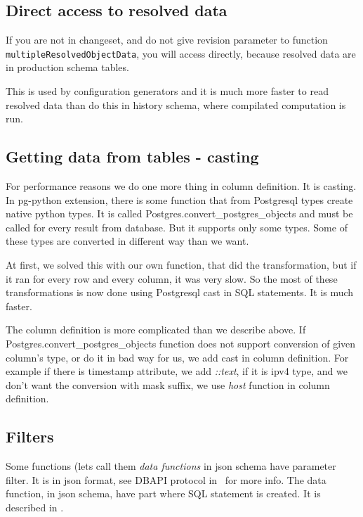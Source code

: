 \documentclass[deska]{subfiles}
\begin{document}
\subsection{Direct access to resolved data}
\label{sec:direct-access}
If you are not in changeset, and do not give revision parameter to function {\tt multipleResolvedObjectData},
you will access directly, because resolved data are in production schema tables.

This is used by configuration generators and it is much more faster to read
resolved data than do this in history schema, where compilated computation is run.

\subsection{Getting data from tables - casting}
\label{sec:cast}
For performance reasons we do one more thing in column definition. It is casting.
In pg-python extension, there is some function that from Postgresql types create native python types.
It is called Postgres.convert\_postgres\_objects
and must be called for every result from database. But it supports only some types.
Some of these types are converted in different way than we want.

At first, we solved this with our own function, that did the transformation, but if it ran for every
row and every column, it was very slow. So the most of these transformations is now done using Postgresql cast
in SQL statements. It is much faster.

The column definition is more complicated than we describe above. If
Postgres.convert\_postgres\_objects function 
does not support conversion of given column's type, or do it in bad way for us, we add cast in column definition.
For example if there is timestamp attribute, we add {\em ::text}, if it is ipv4 type, and we don't want
the conversion with mask suffix, we use {\em host} function in column definition.


\subsection{Filters}

Some functions (lets call them {\em data functions} in json schema have parameter filter. It is in json format,
see DBAPI protocol in~ for more info.
The data function, in json schema, have part where SQL statement is created. It is described in
.
\end{document}
